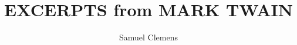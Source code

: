\documentclass{novelette} %
\title{EXCERPTS from MARK TWAIN}
\author{Samuel Clemens}
\begin{document}
\frontmatter


\mainmatter
\header{\allsmcp{\thetitle}}{\ital{\theauthor}}



\end{document}
